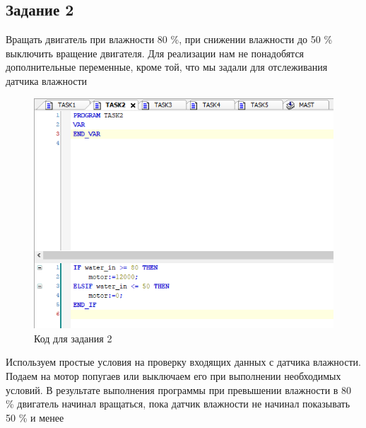 \documentclass[a4paper, 16pt]{article}
\begin{document}
    \subsection{Задание 2}
    \noindent Вращать двигатель при влажности 80 \%, при снижении влажности до 50 \% выключить вращение двигателя. Для
    реализации нам не понадобятся дополнительные переменные, кроме той, что мы задали для отслеживания датчика влажности
    \begin{figure}[h!]
        \centering
        \includegraphics[scale=0.8]{t2.png}
        \captionsetup{skip=0pt}
        \caption{Код для задания 2}
        \label{Рис:5}
    \end{figure}


    \noindent Используем простые условия на проверку входящих данных с датчика влажности. Подаем на мотор
    попугаев или выключаем его при выполнении необходимых условий. В результате выполнения программы при превышении
    влажности в 80 \% двигатель начинал вращаться, пока датчик влажности не начинал показывать 50 \% и менее

    
    \newpage
\end{document}
